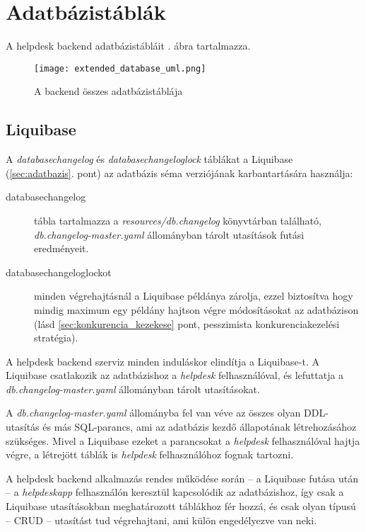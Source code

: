 \section{Adatbázistáblák}
A helpdesk backend adatbázistábláit . ábra tartalmazza.

\begin{figure}[hbt] 
	\centering
	\texttt{[image: extended\_database\_uml.png]}
	\caption{A backend összes adatbázistáblája}
	\label{fig:extended_database_uml}
\end{figure}


\subsection{Liquibase}\label{sec:liquibase}
A \textit{databasechangelog} és \textit{databasechangeloglock} táblákat a Liquibase (\ref{sec:adatbazis}. pont) az adatbázis séma verziójának karbantartására használja:
\begin{description}
	\item[databasechangelog] tábla tartalmazza a \mbox{\textit{resources/db.changelog}} könyvtárban található,  \mbox{\textit{db.changelog-master.yaml}} állományban tárolt utasítások futási eredményeit.
	
	\item[databasechangeloglockot] minden végrehajtásnál a Liquibase példánya  zárolja, ezzel biztosítva hogy mindig maximum egy példány hajtson végre módosításokat az adatbázison (lásd \ref{sec:konkurencia_kezekese} pont, pesszimista konkurenciakezelési stratégia).
\end{description}

A helpdesk backend szerviz minden induláskor elindítja a Liquibase-t. A Liquibase csatlakozik az adatbázishoz a \textit{helpdesk} felhasználóval, és lefuttatja a \mbox{\textit{db.changelog-master.yaml}} állományban tárolt utasításokat.

A \mbox{\textit{db.changelog-master.yaml}} állományba fel van véve az összes olyan DDL-utasítás és más SQL-parancs, ami az adatbázis kezdő állapotának létrehozásához szükséges. Mivel a Liquibase ezeket a parancsokat a \textit{helpdesk} felhasználóval hajtja végre, a létrejött táblák is \textit{helpdesk} felhasználóhoz fognak tartozni. 

A helpdesk backend alkalmazás rendes működése során --  a Liquibase futása után --   a \textit{helpdesk\textunderscore app} felhasználón keresztül kapcsolódik az adatbázishoz, így csak a Liquibase utasításokban meghatározott táblákhoz fér hozzá, és csak olyan típusú --  CRUD --   utasítást tud végrehajtani, ami külön engedélyezve van neki.

